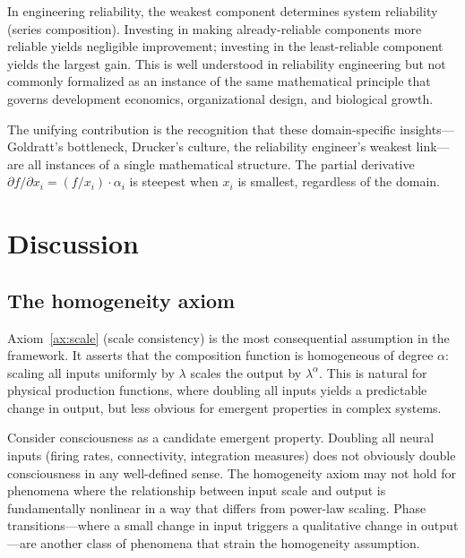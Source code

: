 \documentclass[12pt, a4paper]{article}
\theoremstyle{definition}
\theoremstyle{remark}
\begin{document}
In engineering reliability, the weakest component determines system reliability (series composition). Investing in making already-reliable components more reliable yields negligible improvement; investing in the least-reliable component yields the largest gain. This is well understood in reliability engineering but not commonly formalized as an instance of the same mathematical principle that governs development economics, organizational design, and biological growth.

The unifying contribution is the recognition that these domain-specific insights---Goldratt's bottleneck, Drucker's culture, the reliability engineer's weakest link---are all instances of a single mathematical structure. The partial derivative $\partial f / \partial x_i = (f / x_i) \cdot \alpha_i$ is steepest when $x_i$ is smallest, regardless of the domain.


\section{Discussion}\label{sec:discussion}

\subsection{The homogeneity axiom}\label{sec:homogeneity}

Axiom~\ref{ax:scale} (scale consistency) is the most consequential assumption in the framework. It asserts that the composition function is homogeneous of degree $\alpha$: scaling all inputs uniformly by $\lambda$ scales the output by $\lambda^\alpha$. This is natural for physical production functions, where doubling all inputs yields a predictable change in output, but less obvious for emergent properties in complex systems.

Consider consciousness as a candidate emergent property. Doubling all neural inputs (firing rates, connectivity, integration measures) does not obviously double consciousness in any well-defined sense. The homogeneity axiom may not hold for phenomena where the relationship between input scale and output is fundamentally nonlinear in a way that differs from power-law scaling. Phase transitions---where a small change in input triggers a qualitative change in output---are another class of phenomena that strain the homogeneity assumption.
\end{document}
